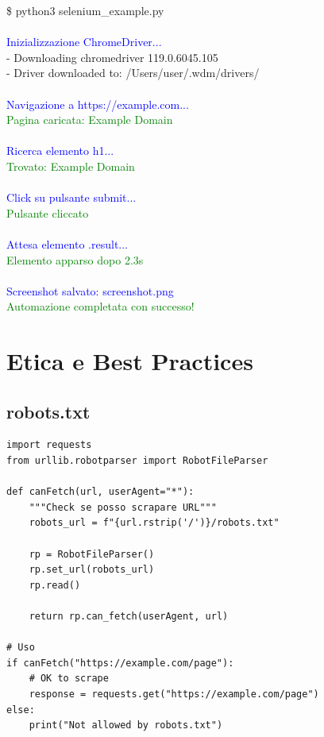 \begin{center}
\begin{tcolorbox}[title=Terminal Output: Selenium automation, colback=black!5, coltitle=white, colbacktitle=orange!50!black, width=0.95\textwidth, fonttitle=\bfseries\ttfamily, fontupper=\small\ttfamily]
\$ python3 selenium\_example.py\\
\\
\textcolor{blue}{Inizializzazione ChromeDriver...}\\
[WDM] - Downloading chromedriver 119.0.6045.105\\
[WDM] - Driver downloaded to: /Users/user/.wdm/drivers/\\
\\
\textcolor{blue}{Navigazione a https://example.com...}\\
\textcolor{green}{Pagina caricata: Example Domain}\\
\\
\textcolor{blue}{Ricerca elemento h1...}\\
\textcolor{green}{Trovato: Example Domain}\\
\\
\textcolor{blue}{Click su pulsante submit...}\\
\textcolor{green}{Pulsante cliccato}\\
\\
\textcolor{blue}{Attesa elemento .result...}\\
\textcolor{green}{Elemento apparso dopo 2.3s}\\
\\
\textcolor{blue}{Screenshot salvato: screenshot.png}\\
\textcolor{green}{Automazione completata con successo!}
\end{tcolorbox}
\end{center}

\section{Etica e Best Practices}

\subsection{robots.txt}

\begin{lstlisting}
import requests
from urllib.robotparser import RobotFileParser

def canFetch(url, userAgent="*"):
    """Check se posso scrapare URL"""
    robots_url = f"{url.rstrip('/')}/robots.txt"

    rp = RobotFileParser()
    rp.set_url(robots_url)
    rp.read()

    return rp.can_fetch(userAgent, url)

# Uso
if canFetch("https://example.com/page"):
    # OK to scrape
    response = requests.get("https://example.com/page")
else:
    print("Not allowed by robots.txt")
\end{lstlisting}

